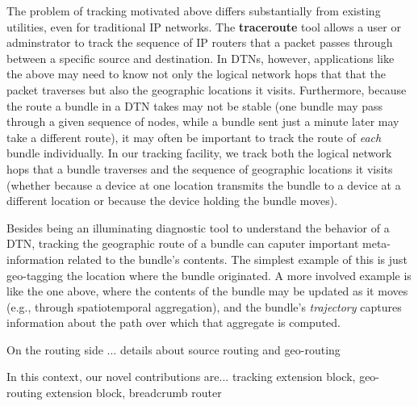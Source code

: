 The problem of tracking motivated above differs substantially from existing utilities, even for traditional IP networks. The {\bf traceroute} tool allows a user or adminstrator to track the sequence of IP routers that a packet passes through between a specific source and destination. In DTNs, however, applications like the above may need to know not only the logical network hops that that the packet traverses but also the geographic locations it visits. Furthermore, because the route a bundle in a DTN takes may not be stable (one bundle may pass through a given sequence of nodes, while a bundle sent just a minute later may take a different route), it may often be important to track the route of {\em each} bundle individually. In our tracking facility, we track both the logical network hops that a bundle traverses and the sequence of geographic locations it visits (whether because a device at one location transmits the bundle to a device at a different location or because the device holding the bundle moves).

Besides being an illuminating diagnostic tool to understand the behavior of a DTN, tracking the geographic route of a bundle can caputer important meta-information related to the bundle's contents. The simplest example of this is just geo-tagging the location where the bundle originated. A more involved example is like the one above, where the contents of the bundle may be updated as it moves (e.g., through spatiotemporal aggregation), and the bundle's {\em trajectory} captures information about the path over which that aggregate is computed.


On the routing side ... {\color{red} details about source routing and geo-routing}

{\color{red} In this context, our novel contributions are... tracking extension block, geo-routing extension block, breadcrumb router}


